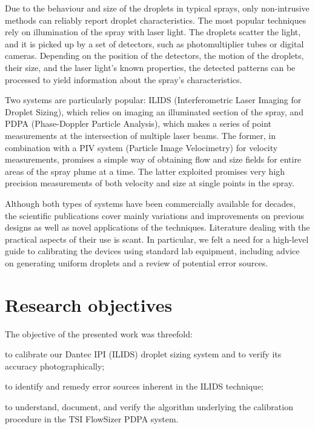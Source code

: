 \documentclass[11.5pt,oneside]{book}
\begin{document}
Due to the behaviour and size of the droplets in typical sprays, only
non-intrusive methods can reliably report droplet characteristics. The most popular
techniques rely on illumination of the spray with laser light. The droplets
scatter the light, and it is picked up by a set of detectors, such as
photomultiplier tubes or digital cameras. Depending on the position of the
detectors, the motion of the droplets, their size, and the laser light's known
properties, the detected patterns can be processed to yield information about
the spray's characteristics.

Two systems are particularly popular: ILIDS (Interferometric Laser Imaging for
Droplet Sizing), which relies on imaging an illuminated section of the spray,
and PDPA (Phase-Doppler Particle Analysis), which makes a series of point
measurements at the intersection of multiple laser beams. The former, in
combination with a PIV system (Particle Image Velocimetry) for velocity
measurements, promises a simple way of obtaining flow and size fields for entire
areas of the spray plume at a time. The latter exploited 
promises very high precision measurements of both velocity and size at single
points in the spray.

Although both types of systems have been commercially available for decades, the
scientific publications cover mainly variations and improvements on previous
designs as well as novel applications of the techniques. Literature dealing with
the practical aspects of their use is scant. In particular, we felt a need for
a high-level guide to calibrating the devices using standard lab equipment,
including advice on generating uniform droplets and a review of potential error
sources.

\section{Research objectives}
The objective of the presented work was threefold:
\begin{alist}
\item to calibrate our Dantec IPI (ILIDS) droplet sizing system and to verify
        its accuracy photographically;
\item to identify and remedy error sources inherent in the ILIDS technique;
\item to understand, document, and verify the algorithm underlying the
        calibration procedure in the TSI FlowSizer PDPA system.
\end{alist}
\end{document}
